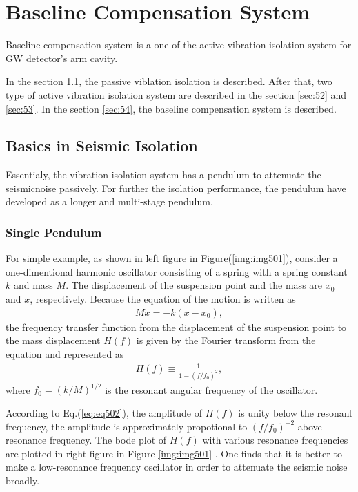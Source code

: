 \chapter{Baseline Compensation System}
Baseline compensation system is a one of the active vibration isolation system for GW detector's arm cavity. 

In the section \cref{sec:51}, the passive viblation isolation is described. After that, two type of active vibration isolation system are described in the section \cref{sec:52} and \cref{sec:53}. In the section \cref{sec:54}, the baseline compensation system is described.

\section{Basics in Seismic Isolation}\label{sec:51}
Essentialy, the vibration isolation system has a pendulum to attenuate the seismicnoise passively. For further the isolation performance, the pendulum have developed as a longer and multi-stage pendulum.

\subsection{Single Pendulum}
For simple example, as shown in left figure in Figure(\ref{img:img501}), consider a one-dimentional harmonic oscillator consisting of a spring with a spring constant $k$ and mass $M$. The displacement of the suspension point and the mass are $x_0$ and $x$, respectively. Because the equation of the motion is written as
\begin{eqnarray} \label{eq:eq501}
  M\ddot{x} = -k(x-x_0),
\end{eqnarray}
the frequency transfer function from the displacement of the suspension point to the mass displacement $H(f)$ is given by the Fourier transform from the equation and represented as
\begin{eqnarray} \label{eq:eq502}
  H(f) \equiv \frac{1}{1-(f/f_0)^2},
\end{eqnarray}
where $f_0 = (k/M)^{1/2}$ is the resonant angular frequency of the oscillator.

According to Eq.(\ref{eq:eq502}), the amplitude of $H(f)$ is unity below the resonant frequency, the amplitude is approximately propotional to $(f/f_0)^{-2}$ above resonance frequency. The bode plot of $H(f)$ with various resonance frequencies are plotted in right figure in Figure \ref{img:img501} . One finds that it is better to make a low-resonance frequency oscillator in order to attenuate the seismic noise broadly. 

